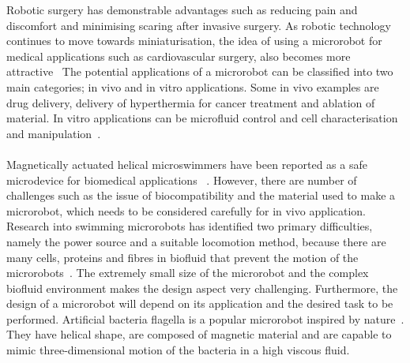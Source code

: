 \documentclass[12pt,a4paper,titlepage]{report}
\begin{document}
Robotic surgery has demonstrable advantages such as reducing pain and discomfort and 
minimising scaring after invasive surgery. As robotic technology continues to move towards miniaturisation, the idea of using
a microrobot for medical applications such as cardiovascular  surgery, also becomes more attractive~\citep{phil2013robotics}
The potential applications of a microrobot can be classified into two main categories; in vivo and in vitro applications.
Some in vivo examples are drug delivery, delivery of hyperthermia for cancer treatment and ablation  of material.
In vitro applications can be microfluid control and cell characterisation and manipulation~\citep{edd2003biomimetic}.  


\paragraph{}

Magnetically actuated helical microswimmers have been reported as a safe microdevice for biomedical applications
~\citep{peyer2013magnetic}. However, there are number of challenges such as the issue of biocompatibility and the material 
used to make a microrobot, which needs to be considered carefully for in vivo application\citep{qiu2014noncytotoxic}.
Research into swimming microrobots has identified two primary difficulties, namely the power source and a suitable locomotion method, because
there are many cells, proteins and fibres in biofluid that prevent the motion of the microrobots~\citep{peyer2013bio}. 
The extremely small size of the microrobot and the
complex biofluid environment makes the design aspect very challenging.   
Furthermore, the design of a microrobot will depend on its application and the desired task to be performed.
Artificial bacteria flagella is a popular microrobot inspired by nature~\citep{qiu2014noncytotoxic}. 
They have helical shape, are composed of magnetic material and are capable to mimic three-dimensional 
motion of the bacteria in a high viscous fluid.

 
\end{document}
